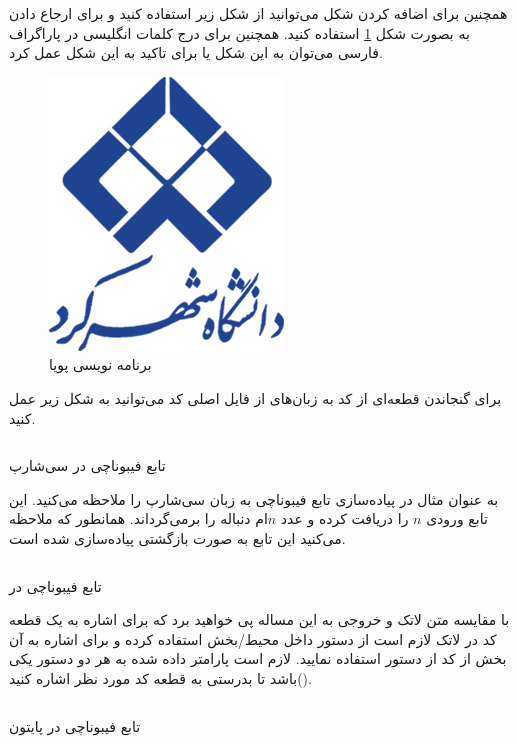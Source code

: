 همچنین برای اضافه کردن شکل می‌توانید از شکل زیر استفاده کنید و برای ارجاع دادن به بصورت شکل
 \ref{fig:dynamicprogramming}
 استفاده کنید.
 همچنین برای درج کلمات انگلیسی در پاراگراف فارسی می‌توان به این شکل
 یا برای تاکید به این شکل
 عمل کرد.
\begin{figure}[H]
    \centering
    \includegraphics[width=0.4\linewidth]{images/SKU_logo_color.jpg}
    \caption{برنامه نویسی پویا}
    \label{fig:dynamicprogramming}
\end{figure}

برای گنجاندن قطعه‌ای از کد به زبان‌های 
از فایل اصلی کد می‌توانید به شکل زیر عمل کنید.
 
\begin{program}[H]
    \inputminted[frame=none]{csharp}{Sample.cs}
    \caption{تابع فیبوناچی در سی‌شارپ}
    \label{csharpfib}
\end{program}

به عنوان مثال در 
پیاده‌سازی تابع فیبوناچی به زبان سی‌شارپ را ملاحظه می‌کنید. این تابع ورودی $n$ را دریافت کرده و عدد $n$ام دنباله را برمی‌گرداند. همانطور که ملاحظه می‌کنید این تابع به صورت بازگشتی پیاده‌سازی شده است.

\begin{program}[H]
\inputminted[frame=none]{cpp}{Sample.cpp}
\caption{تابع فیبوناچی در  }
\label{cppfib}
\end{program}

با مقایسه متن لاتک و خروجی به این مساله پی‌ خواهید برد که برای اشاره به یک قطعه کد در لاتک لازم است از دستور
داخل محیط/بخش 
استفاده کرده و برای اشاره به آن بخش از کد از دستور
استفاده نمایید. لازم است پارامتر داده شده به هر دو دستور یکی باشد تا بدرستی به قطعه کد مورد نظر اشاره کنید(). 

\begin{program}[H]
\inputminted[frame=none]{python}{sample.py}
\caption{تابع فیبوناچی در پایتون }
\label{pythonfib}
\end{program}

